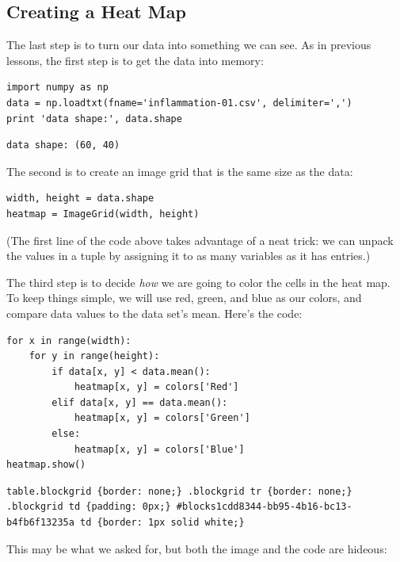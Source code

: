 \documentclass{book}
\begin{document}
\subsection{Creating a Heat Map}

The last step is to turn our data into something we can see. As in
previous lessons, the first step is to get the data into memory:

\begin{verbatim}
import numpy as np
data = np.loadtxt(fname='inflammation-01.csv', delimiter=',')
print 'data shape:', data.shape
\end{verbatim}

\begin{verbatim}
data shape: (60, 40)
\end{verbatim}

The second is to create an image grid that is the same size as the data:

\begin{verbatim}
width, height = data.shape
heatmap = ImageGrid(width, height)
\end{verbatim}

(The first line of the code above takes advantage of a neat trick: we
can unpack the values in a tuple by assigning it to as many variables as
it has entries.)

The third step is to decide \emph{how} we are going to color the cells
in the heat map. To keep things simple, we will use red, green, and blue
as our colors, and compare data values to the data set's mean. Here's
the code:

\begin{verbatim}
for x in range(width):
    for y in range(height):
        if data[x, y] < data.mean():
            heatmap[x, y] = colors['Red']
        elif data[x, y] == data.mean():
            heatmap[x, y] = colors['Green']
        else:
            heatmap[x, y] = colors['Blue']
heatmap.show()
\end{verbatim}

\begin{verbatim}
table.blockgrid {border: none;} .blockgrid tr {border: none;} .blockgrid td {padding: 0px;} #blocks1cdd8344-bb95-4b16-bc13-b4fb6f13235a td {border: 1px solid white;}
\end{verbatim}

This may be what we asked for, but both the image and the code are
hideous:
\end{document}
